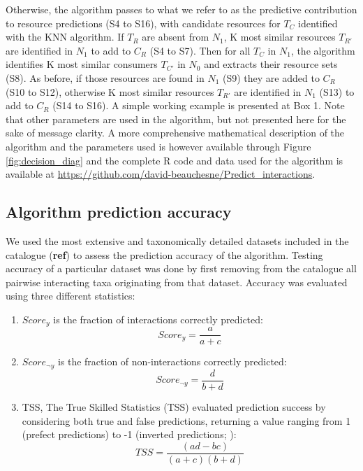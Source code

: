 \documentclass[letterpaper]{article}
\begin{document}
Otherwise, the algorithm passes to what we refer to as the predictive contribution to resource predictions (S4 to S16), with candidate resources for $T_C$ identified with the KNN algorithm. If $T_R$ are absent from $N_1$, K most similar resources $T_{R'}$ are identified in $N_1$ to add to $C_R$ (S4 to S7). Then for all $T_C$ in $N_1$, the algorithm identifies K most similar consumers $T_{C'}$ in $N_0$ and extracts their resource sets (S8). As before, if those resources are found in $N_1$ (S9) they are added to $C_R$ (S10 to S12), otherwise K most similar resources $T_{R'}$ are identified in $N_1$ (S13) to add to $C_R$ (S14 to S16). A simple working example is presented at Box 1. Note that other parameters are used in the algorithm, but not presented here for the sake of message clarity. A more comprehensive mathematical description of the algorithm and the parameters used is however available through Figure \ref{fig:decision_diag} and the complete R code and data used for the algorithm is available at \href{https://github.com/david-beauchesne/Predict_interactions}{https://github.com/david-beauchesne/Predict\_interactions}.


\subsection{Algorithm prediction accuracy}
We used the most extensive and taxonomically detailed datasets included in the catalogue (\textbf{ref}) to assess the prediction accuracy of the algorithm. Testing accuracy of a particular dataset was done by first removing from the catalogue all pairwise interacting taxa originating from that dataset. Accuracy was evaluated using three different statistics:

\begin{enumerate}
 \item $Score_y$ is the fraction of interactions correctly predicted:
     \begin{equation}
         Score_y = \frac{a}{a + c}
     \end{equation}

 \item $Score_{\neg y}$ is the fraction of non-interactions correctly predicted:
     \begin{equation}
       Score_{\neg y}  = \frac{d}{b + d}
     \end{equation}

 \item TSS, The True Skilled Statistics (TSS) evaluated prediction success by considering both true and false predictions, returning a value ranging from 1 (prefect predictions) to -1 (inverted predictions; \cite{Allouche2006}):
     \begin{equation}
       TSS = \frac{(ad - bc)}{(a + c)(b + d)}
     \end{equation}
\end{enumerate}
\end{document}
